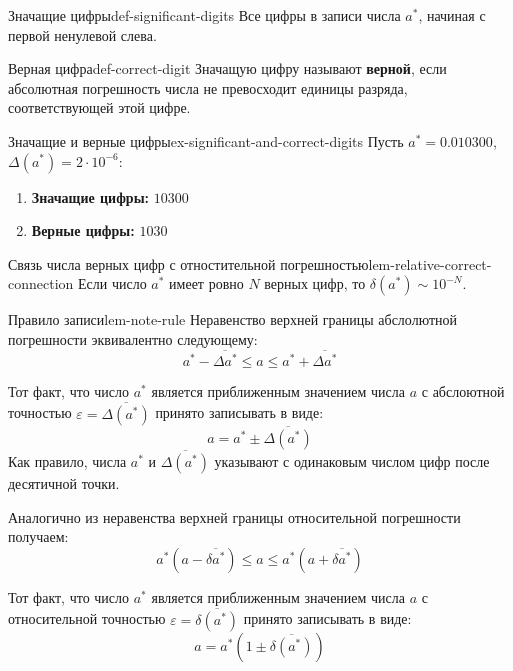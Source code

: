 \documentclass[14pt]{extarticle}
\begin{document}
        \begin{definition}{Значащие цифры}{def-significant-digits}
            Все цифры в записи числа $a^{*}$, начиная с первой ненулевой слева.
        \end{definition}

        \begin{definition}{Верная цифра}{def-correct-digit}
            Значащую цифру называют \textbf{верной}, если абсолютная погрешность числа не превосходит единицы разряда, соответствующей этой цифре.
        \end{definition}

        \begin{example}{Значащие и верные цифры}{ex-significant-and-correct-digits}
            Пусть $a^{*} = 0.010300$, $\Delta(a^{*}) = 2 \cdot 10^{-6}$:
            
            \begin{enumerate}
                \item \textbf{Значащие цифры:} $10300$
                \item \textbf{Верные цифры:} $1030$
            \end{enumerate}
        \end{example}

        \begin{lemma}{Связь числа верных цифр с отностительной погрешностью}{lem-relative-correct-connection}
            Если число $a^{*}$ имеет ровно $N$ верных цифр, то $\delta(a^{*}) \sim 10^{-N}$.
        \end{lemma}

        \begin{lemma}{Правило записи}{lem-note-rule}
            Неравенство верхней границы абслолютной погрешности эквивалентно следующему:
            $$a^{*} - \overline{\Delta{a^{*}}} \leq a \leq a^{*} + \overline{\Delta{a^{*}}}$$
            
            Тот факт, что число $a^{*}$ является приближенным значением числа $a$ с абслоютной точностью $\varepsilon = \overline{\Delta(a^{*})}$ принято записывать в виде:
            $$a = a^{*} \pm \overline{\Delta(a^{*})}$$
            Как правило, числа $a^{*}$ и $\overline{\Delta(a^{*})}$ указывают с одинаковым числом цифр после десятичной точки.
        
            \vspace{\baselineskip}
        
            Аналогично из неравенства верхней границы относительной погрешности получаем:
            $$a^{*}(a - \overline{\delta{a^{*}}}) \leq a \leq a^{*}(a + \overline{\delta{a^{*}}})$$
            
            Тот факт, что число $a^{*}$ является приближенным значением числа $a$ с относительной точностью $\varepsilon = \overline{\delta(a^{*})}$ принято записывать в виде:
            $$a = a^{*}(1 \pm \overline{\delta(a^{*})})$$
        \end{lemma}
\end{document}
